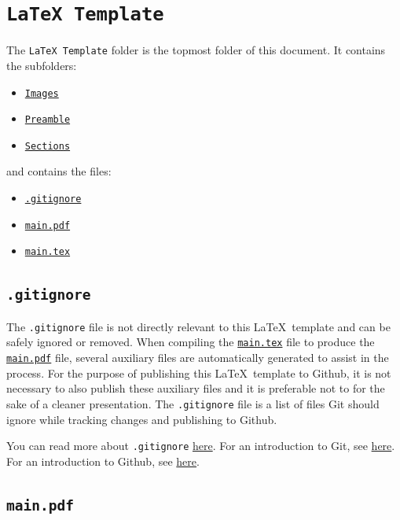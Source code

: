 \section{\texttt{LaTeX Template}}
\label{sec:latex_template}

The \texttt{LaTeX Template} folder is the topmost folder of this document. It contains the subfolders:
\begin{itemize}
    \item \hyperref[sec:images]{\texttt{Images}}
    \item \hyperref[sec:preamble]{\texttt{Preamble}}
    \item \hyperref[sec:sections]{\texttt{Sections}}
\end{itemize}
and contains the files:
\begin{itemize}
    \item \hyperref[sec:.gitignore]{\texttt{.gitignore}}
    \item \hyperref[sec:main.pdf]{\texttt{main.pdf}}
    \item \hyperref[sec:main.tex]{\texttt{main.tex}}
\end{itemize}

\subsection{\texttt{.gitignore}}
\label{sec:.gitignore}

The \texttt{.gitignore} file is not directly relevant to this \LaTeX\ template and can be safely ignored or removed. When compiling the \hyperref[sec:main.tex]{\texttt{main.tex}} file to produce the \hyperref[sec:main.pdf]{\texttt{main.pdf}} file, several auxiliary files are automatically generated to assist in the process. For the purpose of publishing this \LaTeX\ template to Github, it is not necessary to also publish these auxiliary files and it is preferable not to for the sake of a cleaner presentation. The \texttt{.gitignore} file is a list of files Git should ignore while tracking changes and publishing to Github.

You can read more about \texttt{.gitignore} \href{https://git-scm.com/docs/gitignore}{here}. For an introduction to Git, see \href{https://git-scm.com/book/en/v2}{here}. For an introduction to Github, see \href{https://skills.github.com/}{here}.

\subsection{\texttt{main.pdf}}
\label{sec:main.pdf}

